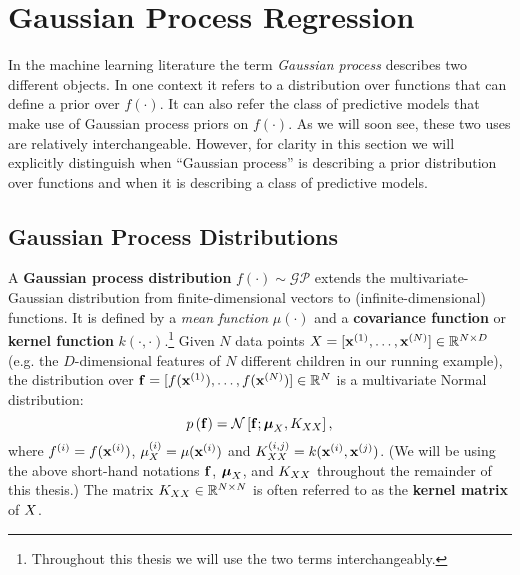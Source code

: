 \section{Gaussian Process Regression}
\label{sec:gps}

In the machine learning literature the term \emph{Gaussian process} describes two different objects.
In one context it refers to a distribution over functions that can define a prior over $f(\cdot)$.
It can also refer the class of predictive models that make use of Gaussian process priors on $f(\cdot)$.
As we will soon see, these two uses are relatively interchangeable.
However, for clarity in this section we will explicitly distinguish when ``Gaussian process'' is describing a prior distribution over functions and when it is describing a class of predictive models.

\subsection{Gaussian Process Distributions}
A {\bf Gaussian process distribution} $f(\cdot) \sim \mathcal{GP}$ extends the multivariate-Gaussian distribution from finite-dimensional vectors to (infinite-dimensional) functions.
It is defined by a \emph{mean function} $\mu(\cdot)$ and a {\bf covariance function} or {\bf kernel function} $k(\cdot, \cdot)$.\footnote{

  Throughout this thesis we will use the two terms interchangeably.
}
Given $N$ data points $X = [ \mathbf{x}^{(1)}, \ldots, \mathbf{x}^{(N)} ] \in \mathbb{R}^{N \times D}$ (e.g. the $D$-dimensional features of $N$ different children in our running example),
the distribution over $\mathbf{f} = [ f(\mathbf{x}^{(1)}), \ldots, f(\mathbf{x}^{(N)}) ] \in \mathbb{R}^{N}$ is a multivariate Normal distribution:
\begin{equation}
 p \left( \bfn \right) = \normaldist{ \bfn ; \bmu_\bX}{ \bK_{\bX\bX} },
 \label{eqn:prior_finite}
\end{equation}
where $f^{(i)} = f(\mathbf{x}^{(i)})$, $\mu^{(i)}_{X} = \mu( \mathbf{x}^{(i)} )$ and $K_{XX}^{(i,j)} = k(\mathbf{x}^{(i)}, \mathbf{x}^{(j)})$.
(We will be using the above short-hand notations $\mathbf{f}$, $\boldsymbol{\mu}_{X}$, and $K_{XX}$ throughout the remainder of this thesis.)
The matrix $K_{XX} \in \mathbb{R}^{N \times N}$ is often referred to as the {\bf kernel matrix} of $X$.

